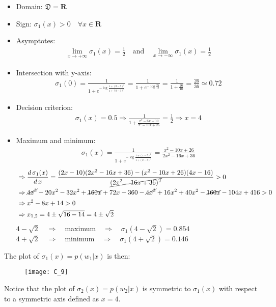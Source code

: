 \begin{itemize}
    \item\quad Domain: \(\mathfrak{D}=\mathbf{R}\)
    \item\quad Sign: \(\sigma_1(x)>0 \quad\forall{x}\in \mathbf{R}\)
    \item\quad Asymptotes:
    \begin{align*}
        \lim_{x\to{+\infty}}{\sigma_1(x)}=\frac{1}{2}
        \quad\text{and}\quad
        \lim_{x\to{-\infty}}{\sigma_1(x)}=\frac{1}{2}
    \end{align*}
    \item\quad Intersection with y-axis:
    \begin{align*}
        \sigma_1(0)
        =\frac{1}{1+e^{-\log{\frac{1+(0-5)^2}{1+(0-3)^2}}}}
        =\frac{1}{1+e^{-\log{\frac{26}{10}}}}
        =\frac{1}{1+\frac{26}{10}}
        =\frac{26}{36}
        \simeq 0.72
    \end{align*}
    \item\quad Decision criterion:
    \begin{align*}
        \sigma_1(x)=0.5
        \Rightarrow
        \frac{1}{1+\frac{x^2-6x+10}{x^2-10x+26}}=\frac{1}{2}
        \Rightarrow
        x=4
    \end{align*}
    \item\quad Maximum and minimum:
    \begin{align*}
        \sigma_1(x)
        =\frac{1}{1+e^{-\log{\frac{1+(x-5)^2}{1+(x-3)^2}}}}
        =\frac{x^2-10x+26}{2x^2-16x+36}
    \end{align*}
    \begin{align*}
        &\Rightarrow
        \frac{d\,\sigma_1(x)}{d\,x}
        =\frac{(2x-10)(2x^2-16x+36)-(x^2-10x+26)(4x-16)}{\cancel{(2x^2-16x+36)^2}}
        >0\\
        &\Rightarrow
        \cancel{4x^3}-20x^2-32x^2+\cancel{160x}+72x-360-\cancel{4x^3}+16x^2+40x^2-\cancel{160x}-104x+416>0\\
        &\Rightarrow
        x^2-8x+14>0\\
        &\Rightarrow
        x_{1,2}=4\pm\sqrt{16-14}=4\pm\sqrt{2}
    \end{align*}
    \(4-\sqrt{2}\quad\Rightarrow\quad\)maximum\(\quad\Rightarrow\quad\sigma_1(4-\sqrt{2})=0.854\)\\
    \(4+\sqrt{2}\quad\Rightarrow\quad\)minimum\(\quad\Rightarrow\quad\sigma_1(4+\sqrt{2})=0.146\)
\end{itemize}
The plot of \(\sigma_1(x)=p(w_1|x)\) is then:
\begin{figure}[H]
    \texttt{[image: C\_9]}
    \centering
\end{figure}
Notice that the plot of \(\sigma_2(x)=p(w_2|x)\) is symmetric to
\(\sigma_1(x)\) with respect to a symmetric axis defined as \(x=4\).